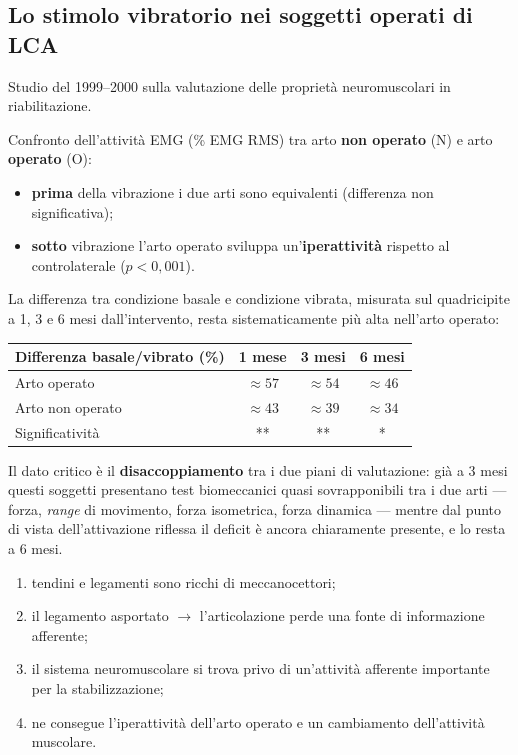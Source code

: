 \subsection{Lo stimolo vibratorio nei soggetti operati di LCA}

Studio del 1999--2000 sulla valutazione delle proprietà neuromuscolari in riabilitazione.

Confronto dell'attività EMG (\% EMG RMS) tra arto \textbf{non operato} (N) e arto \textbf{operato}
(O):
\begin{itemize}
  \item \textbf{prima} della vibrazione i due arti sono equivalenti (differenza non significativa);
  \item \textbf{sotto} vibrazione l'arto operato sviluppa un'\textbf{iperattività} rispetto al
    controlaterale ($p<0{,}001$).
\end{itemize}

La differenza tra condizione basale e condizione vibrata, misurata sul quadricipite a 1, 3 e 6 mesi
dall'intervento, resta sistematicamente più alta nell'arto operato:

\begin{table}[htbp]
  \centering
  \small
  \renewcommand{\arraystretch}{1.3}
  \begin{tabularx}{\textwidth}{|X|c|c|c|}
    \hline
    \textbf{Differenza basale/vibrato (\%)} & \textbf{1 mese} & \textbf{3 mesi} & \textbf{6 mesi} \\
    \hline
    Arto operato & $\approx 57$ & $\approx 54$ & $\approx 46$ \\
    \hline
    Arto non operato & $\approx 43$ & $\approx 39$ & $\approx 34$ \\
    \hline
    Significatività & ** & ** & * \\
    \hline
  \end{tabularx}
\end{table}

Il dato critico è il \textbf{disaccoppiamento} tra i due piani di valutazione: già a 3 mesi questi
soggetti presentano test biomeccanici quasi sovrapponibili tra i due arti --- forza, \textit{range}
di movimento, forza isometrica, forza dinamica --- mentre dal punto di vista dell'attivazione
riflessa il deficit è ancora chiaramente presente, e lo resta a 6 mesi.

\begin{enumerate}
  \item tendini e legamenti sono ricchi di meccanocettori;
  \item il legamento asportato $\rightarrow$ l'articolazione perde una fonte di informazione
    afferente;
  \item il sistema neuromuscolare si trova privo di un'attività afferente importante per la
    stabilizzazione;
  \item ne consegue l'iperattività dell'arto operato e un cambiamento dell'attività muscolare.
\end{enumerate}

